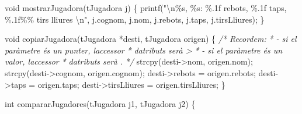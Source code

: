 \documentclass[]{book}
\newenvironment{Shaded}{\begin{snugshade}}{\end{snugshade}}
\newcommand{\CommentTok}[1]{\textcolor[rgb]{0.56,0.35,0.01}{\textit{#1}}}
\newcommand{\DataTypeTok}[1]{\textcolor[rgb]{0.13,0.29,0.53}{#1}}
\newcommand{\NormalTok}[1]{#1}
\newcommand{\SpecialCharTok}[1]{\textcolor[rgb]{0.00,0.00,0.00}{#1}}
\newcommand{\StringTok}[1]{\textcolor[rgb]{0.31,0.60,0.02}{#1}}
\begin{document}
\begin{Shaded}
\begin{Highlighting}[]
\DataTypeTok{void}\NormalTok{ mostrarJugadora(tJugadora j) \{}
\NormalTok{    printf(}\StringTok{"}\SpecialCharTok{\textbackslash{}n}\StringTok{\%s, \%s: \%.1f rebots, \%.1f taps, \%.1f\%\% tirs lliures }\SpecialCharTok{\textbackslash{}n}\StringTok{"}\NormalTok{, j.cognom, j.nom, j.rebots, j.taps, j.tirsLliures);}
\NormalTok{\}}

\DataTypeTok{void}\NormalTok{ copiarJugadora(tJugadora *desti, tJugadora origen) \{}
    \CommentTok{/* Recordem: }
\CommentTok{     * {-} si el paràmetre és un punter, l\textquotesingle{}accessor }
\CommentTok{     *   d\textquotesingle{}atributs serà \textquotesingle{}{-}\textgreater{}\textquotesingle{}}
\CommentTok{     * {-} si el paràmetre és un valor, l\textquotesingle{}accessor}
\CommentTok{     *   d\textquotesingle{}atributs serà \textquotesingle{}.\textquotesingle{}}
\CommentTok{     */}
\NormalTok{    strcpy(desti{-}\textgreater{}nom, origen.nom);}
\NormalTok{    strcpy(desti{-}\textgreater{}cognom, origen.cognom);}
\NormalTok{    desti{-}\textgreater{}rebots = origen.rebots;}
\NormalTok{    desti{-}\textgreater{}taps = origen.taps;}
\NormalTok{    desti{-}\textgreater{}tirsLliures = origen.tirsLliures;}
\NormalTok{\}}

\DataTypeTok{int}\NormalTok{ compararJugadores(tJugadora j1, tJugadora j2) \{}
    

\end{Highlighting}
\end{Shaded}
\end{document}
